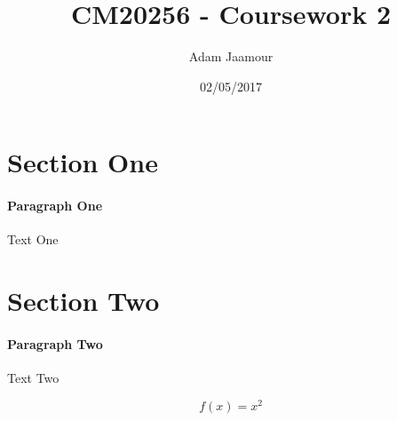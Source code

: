 \documentclass{article}
\title{CM20256 - Coursework 2}
\date{02/05/2017}
\author{Adam Jaamour}
\begin{document}
\maketitle
\newpage
{}

\section{Section One}
\paragraph{Paragraph One}
Text One

\section{Section Two}
\paragraph{Paragraph Two}
Text Two

\begin{equation*}
f(x) = x^2
\end{equation*}
\end{document}
